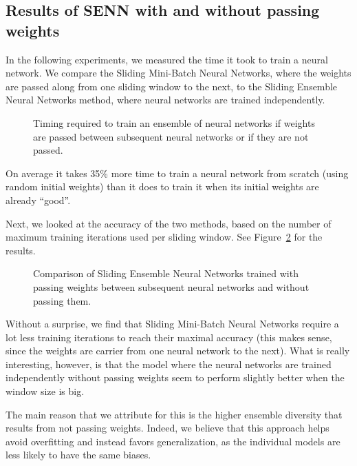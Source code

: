 \documentclass[conference]{IEEEtran}
\begin{document}
		\subsection{Results of SENN with and without passing weights}
		\label{sec:passing-weights}
		
		In the following experiments, we measured the time it took to train a neural network. We compare the Sliding Mini-Batch Neural Networks, where the weights are passed along from one sliding window to the next, to the Sliding Ensemble Neural Networks method, where neural networks are trained independently.
		
		\begin{figure}[H]
			\centering
			\caption{Timing required to train an ensemble of neural networks if weights are passed between subsequent neural networks or if they are not passed.}
			\label{fig:results-nnet-ens-timing}
		\end{figure}
		
		On average it takes 35\% more time to train a neural network from scratch (using random initial weights) than it does to train it when its initial weights are already ``good''.
		
		Next, we looked at the accuracy of the two methods, based on the number of maximum training iterations used per sliding window. See Figure~\ref{fig:maxit} for the results.
		\begin{figure}[H]
			\centering
			\caption{Comparison of Sliding Ensemble Neural Networks trained with passing weights between subsequent neural networks and without passing them.}
			\label{fig:maxit}
		\end{figure}
		
		Without a surprise, we find that Sliding Mini-Batch Neural Networks require a lot less training iterations to reach their maximal accuracy (this makes sense, since the weights are carrier from one neural network to the next). What is really interesting, however, is that the model where the neural networks are trained independently without passing weights seem to perform slightly better when the window size is big.
		
		The main reason that we attribute for this is the higher ensemble diversity that results from not passing weights. Indeed, we believe that this approach helps avoid overfitting and instead favors generalization, as the individual models are less likely to have the same biases.
		
\end{document}
